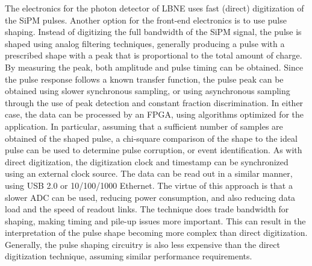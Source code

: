 The electronics for the photon detector of LBNE uses fast (direct)
digitization of the SiPM pulses. Another option for the front-end
electronics is to use pulse shaping. Instead of digitizing the full
bandwidth of the SiPM signal, the pulse is shaped using analog
filtering techniques, generally producing a pulse with a prescribed
shape with a peak that is proportional to the total amount of charge.
By measuring the peak, both amplitude and pulse timing can be
obtained.  Since the pulse response follows a known transfer function,
the pulse peak can be obtained using slower synchronous sampling, or
using asynchronous sampling through the use of peak detection and
constant fraction discrimination.  In either case, the data can be
processed by an FPGA, using algorithms optimized for the application.
In particular, assuming that a sufficient number of samples are
obtained of the shaped pulse, a chi-square comparison of the shape to
the ideal pulse can be used to determine pulse corruption, or event
identification.  As with direct digitization, the digitization clock
and timestamp can be synchronized using an external clock source. The
data can be read out in a similar manner, using USB 2.0 or 10/100/1000
Ethernet.  The virtue of this approach is that a slower ADC can be
used, reducing power consumption, and also reducing data load and the
speed of readout links.  The technique does trade bandwidth for
shaping, making timing and pile-up issues more important.  This can
result in the interpretation of the pulse shape becoming more complex
than direct digitization.  Generally, the pulse shaping circuitry is
also less expensive than the direct digitization technique, assuming
similar performance requirements.


